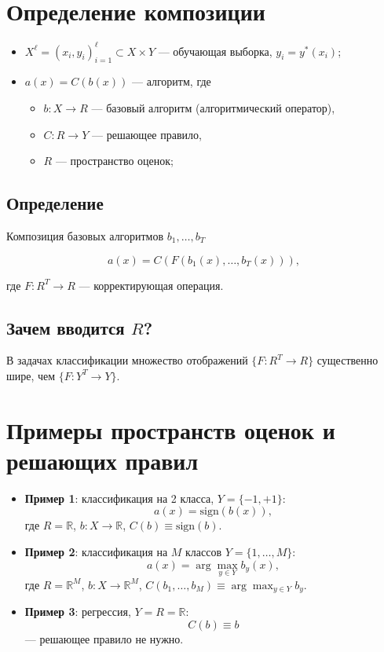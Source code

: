 \section*{Определение композиции}

\begin{itemize}
    \item $X^\ell = (x_i, y_i)_{i=1}^\ell \subset X \times Y$ — обучающая выборка, $y_i = y^*(x_i)$;
    \item $a(x) = C(b(x))$ — алгоритм, где
    \begin{itemize}
        \item $b: X \rightarrow R$ — базовый алгоритм (алгоритмический оператор),
        \item $C: R \rightarrow Y$ — решающее правило,
        \item $R$ — пространство оценок;
    \end{itemize}
\end{itemize}

\subsection*{Определение}
Композиция базовых алгоритмов $b_1, \ldots, b_T$

\[ a(x) = C(F(b_1(x), \ldots, b_T(x))), \]

где $F: R^T \rightarrow R$ — корректирующая операция.

\subsection*{Зачем вводится $R$?}
В задачах классификации множество отображений $\{F : R^T \rightarrow R\}$ существенно шире, чем $\{F : Y^T \rightarrow Y\}$.

\section*{Примеры пространств оценок и решающих правил}

\begin{itemize}
    \item \textbf{Пример 1}: классификация на 2 класса, $Y = \{-1, +1\}$:
    \[
    a(x) = \text{sign}(b(x)),
    \]
    где $R = \mathbb{R}$, $b: X \rightarrow \mathbb{R}$, $C(b) \equiv \text{sign}(b)$.
    
    \item \textbf{Пример 2}: классификация на $M$ классов $Y = \{1, \ldots, M\}$:
    \[
    a(x) = \arg \max_{y \in Y} b_y(x),
    \]
    где $R = \mathbb{R}^M$, $b: X \rightarrow \mathbb{R}^M$, $C(b_1, \ldots, b_M) \equiv \arg \max_{y \in Y} b_y$.
    
    \item \textbf{Пример 3}: регрессия, $Y = R = \mathbb{R}$:
    \[
    C(b) \equiv b
    \]
    — решающее правило не нужно.
\end{itemize}


